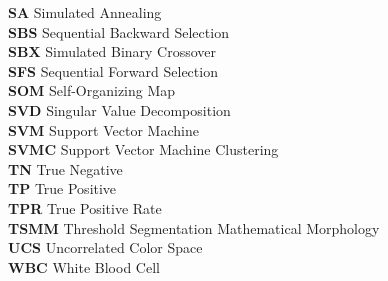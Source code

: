 \begin{nomenclature}
\begin{tabbing}

   \textbf{SA} \> \quad \quad\quad Simulated Annealing \\

  \textbf{SBS} \> \quad \quad\quad Sequential Backward Selection\\

  \textbf{SBX} \> \quad \quad\quad Simulated Binary Crossover \\

  \textbf{SFS} \> \quad \quad\quad Sequential Forward Selection\\

  \textbf{SOM} \> \quad \quad\quad Self-Organizing Map\\

  \textbf{SVD} \> \quad \quad\quad Singular Value Decomposition\\

  \textbf{SVM} \> \quad \quad\quad Support Vector Machine\\

  \textbf{SVMC} \> \quad \quad\quad Support Vector Machine Clustering\\

   \textbf{TN} \> \quad \quad\quad True Negative\\

   \textbf{TP} \> \quad \quad\quad True Positive\\

  \textbf{TPR} \> \quad \quad\quad True Positive Rate\\

  \textbf{TSMM} \> \quad \quad\quad Threshold Segmentation Mathematical Morphology \\

    \textbf{UCS} \> \quad \quad\quad Uncorrelated Color Space\\

  \textbf{WBC} \> \quad \quad\quad White Blood Cell\\
\end{tabbing}

\end{nomenclature} 